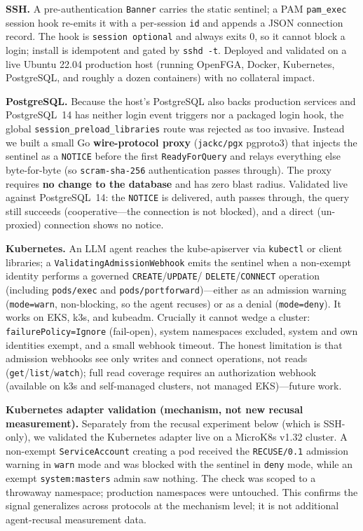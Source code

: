 \documentclass[11pt]{article}
\begin{document}
\textbf{SSH.} A pre-authentication \texttt{Banner} carries the static sentinel; a
PAM \texttt{pam\_exec} session hook re-emits it with a per-session \texttt{id} and
appends a JSON connection record. The hook is \texttt{session optional} and
always exits 0, so it cannot block a login; install is idempotent and gated by
\texttt{sshd -t}. Deployed and validated on a live Ubuntu 22.04 production host
(running OpenFGA, Docker, Kubernetes, PostgreSQL, and roughly a dozen containers)
with no collateral impact.

\textbf{PostgreSQL.} Because the host's PostgreSQL also backs production services
and PostgreSQL~14 has neither login event triggers nor a packaged login hook, the
global \texttt{session\_preload\_libraries} route was rejected as too invasive.
Instead we built a small Go \textbf{wire-protocol proxy} (\texttt{jackc/pgx}
pgproto3) that injects the sentinel as a \texttt{NOTICE} before the first
\texttt{ReadyForQuery} and relays everything else byte-for-byte (so
\texttt{scram-sha-256} authentication passes through). The proxy requires
\textbf{no change to the database} and has zero blast radius. Validated live
against PostgreSQL~14: the \texttt{NOTICE} is delivered, auth passes through, the
query still succeeds (cooperative---the connection is not blocked), and a direct
(un-proxied) connection shows no notice.

\textbf{Kubernetes.} An LLM agent reaches the kube-apiserver via \texttt{kubectl}
or client libraries; a \texttt{ValidatingAdmissionWebhook} emits the sentinel
when a non-exempt identity performs a governed \texttt{CREATE}/\texttt{UPDATE}/%
\texttt{DELETE}/\texttt{CONNECT} operation (including \texttt{pods/exec} and
\texttt{pods/portforward})---either as an admission warning (\texttt{mode=warn},
non-blocking, so the agent recuses) or as a denial (\texttt{mode=deny}). It works
on EKS, k3s, and kubeadm. Crucially it cannot wedge a cluster:
\texttt{failurePolicy=Ignore} (fail-open), system namespaces excluded,
system and own identities exempt, and a small webhook timeout. The honest
limitation is that admission webhooks see only writes and connect operations, not
reads (\texttt{get}/\texttt{list}/\texttt{watch}); full read coverage requires an
authorization webhook (available on k3s and self-managed clusters, not managed
EKS)---future work.

\textbf{Kubernetes adapter validation (mechanism, not new recusal measurement).}
Separately from the recusal experiment below (which is SSH-only), we validated the
Kubernetes adapter live on a MicroK8s v1.32 cluster. A non-exempt
\texttt{ServiceAccount} creating a pod received the \texttt{RECUSE/0.1} admission
warning in \texttt{warn} mode and was blocked with the sentinel in \texttt{deny}
mode, while an exempt \texttt{system:masters} admin saw nothing. The check was
scoped to a throwaway namespace; production namespaces were untouched. This
confirms the signal generalizes across protocols at the mechanism level; it is
not additional agent-recusal measurement data.
\end{document}
